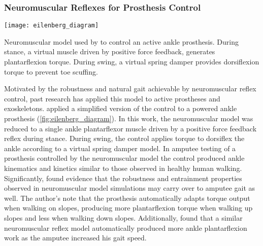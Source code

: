 \subsubsection{Neuromuscular Reflexes for Prosthesis Control}
\begin{marginfigure}
    \centering
    \texttt{[image: eilenberg\_diagram]} \caption{Neuromuscular
    model used by \citet{eilenberg2010control} to control an active ankle
    prosthesis. During stance, a virtual muscle driven by positive force
    feedback, generates plantarflexion torque. During swing, a virtual spring
    damper provides dorsiflexion torque to prevent toe scuffing.}
    \label{fig:eilenberg_diagram}
\end{marginfigure}
Motivated by the robustness and natural gait achievable by neuromuscular
reflex control, past research has applied this model to active prostheses and
exoskeletons. \citet{eilenberg2010control} applied a simplified version of the
control to a powered ankle prosthesis (\cref{fig:eilenberg_diagram}). In this
work, the neuromuscular model was reduced to a single ankle plantarflexor muscle
driven by a positive force feedback reflex during stance. During swing, the
control applies torque to dorsiflex the ankle according to a virtual spring
damper model. In amputee testing of a prosthesis controlled by the neuromuscular
model the control produced ankle kinematics and kinetics similar to those
observed in healthy human walking. Significantly,
\citeauthor{eilenberg2010control} found evidence that the robustness and
entrainment properties observed in neuromuscular model simulations may carry
over to amputee gait as well. The author's note that the prosthesis
automatically adapts torque output when walking on slopes, producing more
plantarflexion torque when walking up slopes and less when walking down slopes.
Additionally, \citet{markowitz2011speed} found that a similar neuromuscular
reflex model automatically produced more ankle plantarflexion work as the
amputee increased his gait speed.

